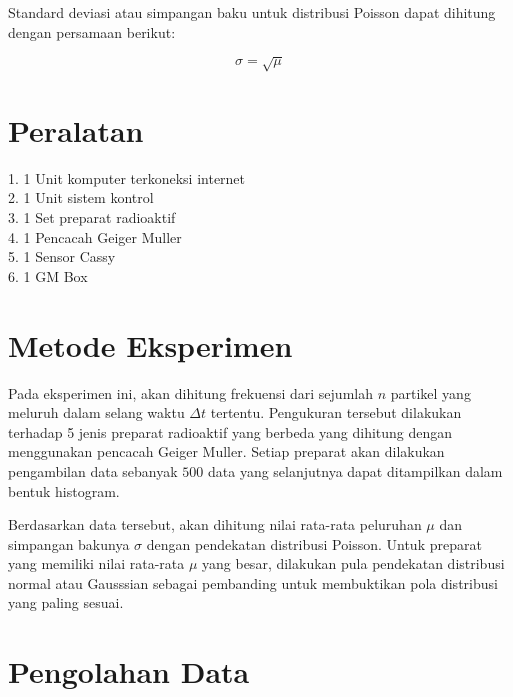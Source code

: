 \documentclass{article}
\begin{document}
		\par Standard deviasi atau simpangan baku untuk distribusi Poisson dapat dihitung dengan persamaan berikut: 
		
		\begin{equation}
			\sigma = \sqrt{\mu}
		\end{equation}
	
	\section{Peralatan}
	1. 1 Unit komputer terkoneksi internet \\
	2. 1 Unit sistem kontrol \\ 
	3. 1 Set preparat radioaktif \\
	4. 1 Pencacah Geiger Muller \\
	5. 1 Sensor Cassy \\
	6. 1 GM Box 
	
	\section{Metode Eksperimen}
	
		\hspace{0.35 cm} Pada eksperimen ini, akan dihitung frekuensi dari sejumlah $n$ partikel yang meluruh dalam selang waktu $\Delta t$ tertentu. Pengukuran tersebut dilakukan terhadap 5 jenis preparat radioaktif yang berbeda yang dihitung dengan menggunakan pencacah Geiger Muller. Setiap preparat akan dilakukan pengambilan data sebanyak $500$ data yang selanjutnya dapat ditampilkan dalam bentuk histogram. 
		
		\par Berdasarkan data tersebut, akan dihitung nilai rata-rata peluruhan $\mu$ dan simpangan bakunya $\sigma$ dengan pendekatan distribusi Poisson. Untuk preparat yang memiliki nilai rata-rata $\mu$ yang besar, dilakukan pula pendekatan distribusi normal atau Gausssian sebagai pembanding untuk membuktikan pola distribusi yang paling sesuai. 
	
	\section{Pengolahan Data}
		
\end{document}
